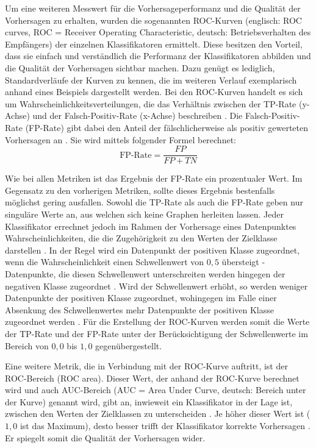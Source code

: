 \label{roc-def}
Um eine weiteren Messwert für die Vorhersageperformanz und die Qualität der Vorhersagen zu erhalten, wurden die sogenannten ROC-Kurven (englisch: ROC curves, ROC = Receiver Operating Characteristic, deutsch: Betriebsverhalten des Empfängers) der einzelnen Klassifikatoren ermittelt. Diese besitzen den Vorteil, dass sie einfach und verständlich die Performanz der Klassifikatoren abbilden und die Qualität der Vorhersagen \glqq sichtbar\grqq{} machen. Dazu genügt es lediglich, Standardverläufe der Kurven zu kennen, die im weiteren Verlauf exemplarisch anhand eines Beispiels dargestellt werden.
Bei den ROC-Kurven handelt es sich um Wahrscheinlichkeitsverteilungen, die das Verhältnis zwischen der TP-Rate (y-Achse) und der Falsch-Positiv-Rate (x-Achse) beschreiben \cite{Sammut2017,Narkhede2018}. Die Falsch-Positiv-Rate (FP-Rate) gibt dabei den Anteil der fälschlicherweise als positiv gewerteten Vorhersagen an \cite{Alpaydin2010}. Sie wird mittels folgender Formel berechnet:
\\\[\text{FP-Rate} = \frac{FP}{FP+TN}\]

Wie bei allen Metriken ist das Ergebnis der FP-Rate ein prozentualer Wert. Im Gegensatz zu den vorherigen Metriken, sollte dieses Ergebnis bestenfalls möglichst gering ausfallen. Sowohl die TP-Rate als auch die FP-Rate geben nur singuläre Werte an, aus welchen sich keine Graphen herleiten lassen. Jeder Klassifikator errechnet jedoch im Rahmen der Vorhersage eines Datenpunktes Wahrscheinlichkeiten, die die Zugehörigkeit zu den Werten der Zielklasse darstellen \cite{KNIMETV2019}. In der Regel wird ein Datenpunkt der positiven Klasse zugeordnet, wenn die Wahrscheinlichkeit einen Schwellenwert von $0,5$ übersteigt - Datenpunkte, die diesen Schwellenwert unterschreiten werden hingegen der negativen Klasse zugeordnet \cite{KNIMETV2019}. Wird der Schwellenwert erhöht, so werden weniger Datenpunkte der positiven Klasse zugeordnet, wohingegen im Falle einer Absenkung des Schwellenwertes mehr Datenpunkte der positiven Klasse zugeordnet werden \cite{KNIMETV2019}. Für die Erstellung der ROC-Kurven werden somit die Werte der TP-Rate und der FP-Rate unter der Berücksichtigung der Schwellenwerte im Bereich von $0,0$ bis $1,0$ gegenübergestellt.

Eine weitere Metrik, die in Verbindung mit der ROC-Kurve auftritt, ist der ROC-Bereich (ROC area). Dieser Wert, der anhand der ROC-Kurve berechnet wird und auch AUC-Bereich (AUC = Area Under Curve, deutsch: Bereich unter der Kurve) genannt wird, gibt an, inwieweit ein Klassifikator in der Lage ist, zwischen den Werten der Zielklassen zu unterscheiden \cite{Narkhede2018}. Je höher dieser Wert ist ($1,0$ ist das Maximum), desto besser trifft der Klassifikator korrekte Vorhersagen \cite{Narkhede2018}. Er spiegelt somit die Qualität der Vorhersagen wider.

